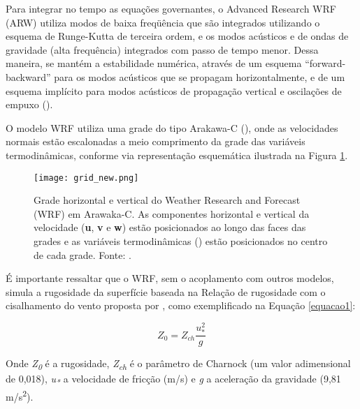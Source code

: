 \noindent Para integrar no tempo as equações governantes, o Advanced Research WRF (ARW) utiliza modos de baixa freqüência que são integrados 
          utilizando o esquema de Runge-Kutta de terceira ordem, e os modos acústicos e de ondas de gravidade (alta frequência) integrados 
          com passo de tempo menor. Dessa maneira, se mantém a estabilidade numérica, através de um esquema “forward-backward” para 
          os modos acústicos que se propagam horizontalmente, e de um esquema implícito para modos acústicos de propagação 
          vertical e oscilações de empuxo (\cite{Skamarock2008}).
\bigskip

\noindent O modelo WRF utiliza uma grade do tipo Arakawa-C (\cite{Arakawa1977}), onde as velocidades normais estão
          escalonadas a meio comprimento da grade das variáveis termodinâmicas, conforme via representação esquemática ilustrada
          na Figura \textcolor{bleu_cite}{\ref{gradeswrf}}.
\bigskip

\begin{figure}[H]
    \centering
    \texttt{[image: grid\_new.png]}
    \caption{Grade horizontal e vertical do Weather Research and Forecast (WRF) em Arawaka-C. As componentes horizontal e vertical
                        da velocidade (\textbf{u}, \textbf{v} e \textbf{w}) estão posicionados ao longo das faces das grades e as variáveis termodinâmicas
                        (\straighttheta) estão posicionados no centro de cada grade. \newline Fonte: \textcite{Skamarock2008}.}
    \label{gradeswrf}
\end{figure}
\bigskip

\noindent É importante ressaltar que o WRF, sem o acoplamento com outros modelos, simula a rugosidade da superfície 
          baseada na Relação de rugosidade com o cisalhamento do vento proposta por \textcite{Charnock1955},
          como exemplificado na Equação \textcolor{bleu_cite}{\ref{equacao1}}:
\bigskip

\begin{equation}
Z_{0} = Z_{ch} \frac{u_{*}^{2}}{g}
\label{equacao1}
\end{equation}

\bigskip

\noindent Onde \textit{Z\textsubscript{0}} é a rugosidade, \textit{Z\textsubscript{ch}} é o parâmetro de Charnock 
         (um valor adimensional de 0,018), \textit{u\textsubscript{*}} a velocidade de fricção (m/s) e \textit{g} a 
         aceleração da gravidade (9,81 m/s\textsuperscript{2}).
\bigskip

